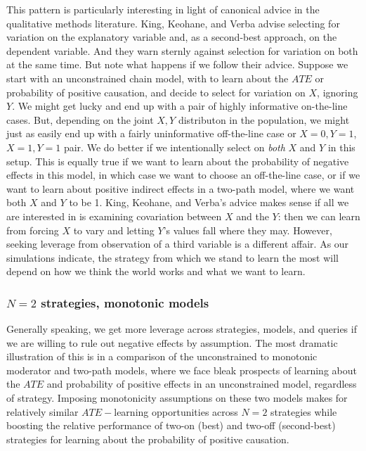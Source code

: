 \documentclass[
  12pt,
]{book}
\begin{document}
This pattern is particularly interesting in light of canonical advice in the qualitative methods literature. King, Keohane, and Verba \citeyearpar{king1994designing} advise selecting for variation on the explanatory variable and, as a second-best approach, on the dependent variable. And they warn sternly against selection for variation on both at the same time. But note what happens if we follow their advice. Suppose we start with an unconstrained chain model, with to learn about the \(ATE\) or probability of positive causation, and decide to select for variation on \(X\), ignoring \(Y\). We might get lucky and end up with a pair of highly informative on-the-line cases. But, depending on the joint \(X,Y\) distributon in the population, we might just as easily end up with a fairly uninformative off-the-line case or \(X=0, Y=1\), \(X=1, Y=1\) pair. We do better if we intentionally select on \emph{both} \(X\) and \(Y\) in this setup. This is equally true if we want to learn about the probability of negative effects in this model, in which case we want to choose an off-the-line case, or if we want to learn about positive indirect effects in a two-path model, where we want both \(X\) and \(Y\) to be 1. King, Keohane, and Verba's advice makes sense if all we are interested in is examining covariation between \(X\) and the \(Y\): then we can learn from forcing \(X\) to vary and letting \(Y\)'s values fall where they may. However, seeking leverage from observation of a third variable is a different affair. As our simulations indicate, the strategy from which we stand to learn the most will depend on how we think the world works and what we want to learn.

\hypertarget{n2-strategies-monotonic-models}{%
\subsubsection{\texorpdfstring{\(N=2\) strategies, monotonic models}{N=2 strategies, monotonic models}}\label{n2-strategies-monotonic-models}}

Generally speaking, we get more leverage across strategies, models, and queries if we are willing to rule out negative effects by assumption. The most dramatic illustration of this is in a comparison of the unconstrained to monotonic moderator and two-path models, where we face bleak prospects of learning about the \(ATE\) and probability of positive effects in an unconstrained model, regardless of strategy. Imposing monotonicity assumptions on these two models makes for relatively similar \(ATE-\)learning opportunities across \(N=2\) strategies while boosting the relative performance of two-on (best) and two-off (second-best) strategies for learning about the probability of positive causation.
\end{document}
